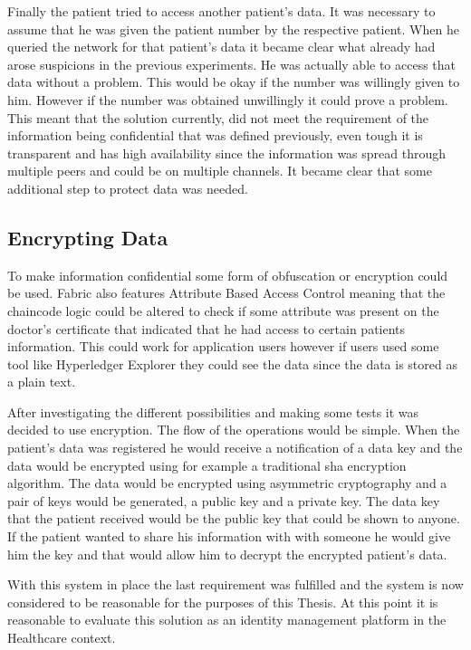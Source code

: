Finally the patient tried to access another patient's data. It was necessary to
assume that he was given the patient number by the respective patient. When he
queried the network for that patient's data it became clear what already had
arose suspicions in the previous experiments. He was actually able to access
that data without a problem. This would be okay if the number was willingly
given to him. However if the number was obtained unwillingly it could prove a
problem. This meant that the solution currently, did not meet the requirement
of the information being confidential that was defined previously, even tough
it is transparent and has high availability since the information was spread
through multiple peers and could be on multiple channels. It became clear that
some additional step to protect data was needed.

\subsection{Encrypting Data}

To make information confidential some form of obfuscation or encryption could
be used. Fabric also features Attribute Based Access Control meaning that the
chaincode logic could be altered to check if some attribute was present on the
doctor's certificate that indicated that he had access to certain patients
information. This could work for application users however if users used some
tool like Hyperledger Explorer they could see the data since the data is stored
as a plain text.

After investigating the different possibilities and making some tests it was
decided to use encryption. The flow of the operations would be simple. When the
patient's data was registered he would receive a notification of a data key and
the data would be encrypted using for example a traditional sha encryption
algorithm. The data would be encrypted using asymmetric cryptography and a pair
of keys would be generated, a public key and a private key. The data key that
the patient received would be the public key that could be shown to anyone. If
the patient wanted to share his information with with someone he would give him
the key and that would allow him to decrypt the encrypted patient's data.

With this system in place the last requirement was fulfilled and the system is
now considered to be reasonable for the purposes of this Thesis. At this point
it is reasonable to evaluate this solution as an identity management platform
in the Healthcare context.

